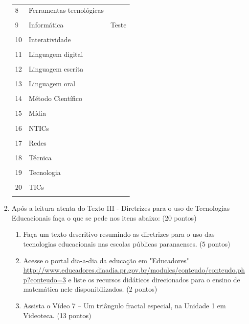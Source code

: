 \documentclass[a4paper, 12pt]{article}
\begin{document}
\begin{enumerate}
\begin{tabular}{|m{0.5cm}|m{5cm}|m{8cm}|}
      \hline
      8 & Ferramentas tecnológicas & \\ \\
      \hline
      9 & Informática & Teste & \\ \\
      \hline
      10 & Interatividade & \\ \\
      \hline
      11 & Linguagem digital & \\ \\
      \hline
      12 & Linguagem escrita & \\ \\
      \hline
      13 & Linguagem oral & \\ \\
      \hline
      14 & Método Científico & \\ \\
      \hline
      15 & Mídia & \\ \\
      \hline
      16 & NTICs & \\ \\
      \hline
      17 & Redes & \\ \\
      \hline
      18 & Técnica & \\ \\
      \hline
      19 & Tecnologia & \\ \\
      \hline
      20 & TICs & \\ \\
      \hline
    \end{tabular}
  \item Após a leitura  atenta do Texto III - Diretrizes para o uso de Tecnologias Educacionais   faça o que se pede nos itens abaixo: (20 pontos)
    \begin{enumerate}
    \item Faça um texto descritivo  resumindo as diretrizes para o uso das tecnologias educacionais nas escolas públicas paranaenses. (5 pontos)
    \item Acesse o portal dia-a-dia da educação  em  "Educadores"
      \url{http://www.educadores.diaadia.pr.gov.br/modules/conteudo/conteudo.php?conteudo=3}
      e liste os recursos didáticos direcionados para o ensino de matemática nele disponibilizados. (2 pontos)
    \item Assista o Vídeo 7 – Um triângulo fractal especial, na Unidade 1 em Videoteca. (13 pontos)
      \begin{itemize}

\end{itemize}
\end{enumerate}
\end{enumerate}
\end{document}
